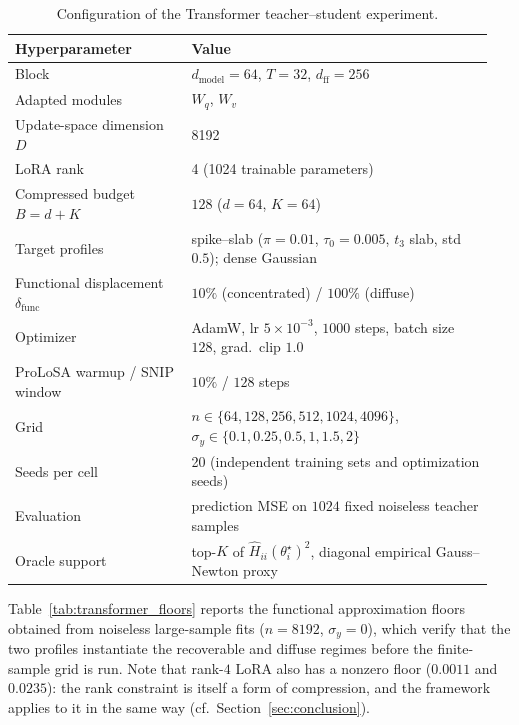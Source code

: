 \begin{table}[htbp]
\centering
\small
\begin{tabular}{@{}p{0.35\linewidth}p{0.60\linewidth}@{}}
\toprule
Hyperparameter & Value \\
\midrule
Block & $d_{\mathrm{model}}=64$, $T=32$, $d_{\mathrm{ff}}=256$ \\
Adapted modules & $W_q$, $W_v$ \\
Update-space dimension $D$ & 8192 \\
LoRA rank & 4 (1024 trainable parameters) \\
Compressed budget $B=d+K$ & $128$ ($d=64$, $K=64$) \\
Target profiles & spike--slab ($\pi=0.01$, $\tau_0=0.005$, $t_3$ slab, std $0.5$); dense Gaussian \\
Functional displacement $\delta_{\mathrm{func}}$ & $10\%$ (concentrated) / $100\%$ (diffuse) \\
Optimizer & AdamW, lr $5\times10^{-3}$, $1000$ steps, batch size $128$, grad.\ clip $1.0$ \\
ProLoSA warmup / SNIP window & $10\%$ / $128$ steps \\
Grid & $n\in\{64,128,256,512,1024,4096\}$, $\sigma_y\in\{0.1,0.25,0.5,1,1.5,2\}$ \\
Seeds per cell & 20 (independent training sets and optimization seeds) \\
Evaluation & prediction MSE on $1024$ fixed noiseless teacher samples \\
Oracle support & top-$K$ of $\widehat H_{ii}(\theta_i^\star)^2$, diagonal empirical Gauss--Newton proxy \\
\bottomrule
\end{tabular}
\caption{Configuration of the Transformer teacher--student experiment.}
\label{tab:transformer_hyperparams}
\end{table}

Table~\ref{tab:transformer_floors} reports the functional approximation
floors obtained from noiseless large-sample fits ($n=8192$, $\sigma_y=0$),
which verify that the two profiles instantiate the recoverable and diffuse
regimes before the finite-sample grid is run.
Note that rank-$4$ LoRA also has a nonzero floor ($0.0011$ and $0.0235$):
the rank constraint is itself a form of compression, and the framework
applies to it in the same way (cf.\ Section~\ref{sec:conclusion}).


